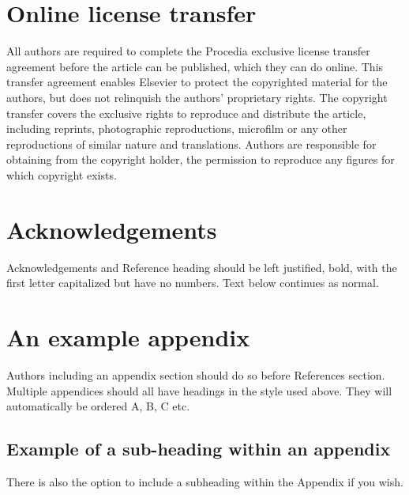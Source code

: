 \documentclass[3p,times,procedia]{elsarticle}
\begin{document}
\section{Online license transfer}
All authors are required to complete the Procedia exclusive license transfer agreement before the article can be published, which they can do online. This transfer agreement enables Elsevier to protect the copyrighted material for the authors, but does not relinquish the authors' proprietary rights. The copyright transfer covers the exclusive rights to reproduce and distribute the article, including reprints, photographic reproductions, microfilm or any other reproductions of similar nature and translations. Authors are responsible for obtaining from the copyright holder, the permission to reproduce any figures for which copyright exists.

\section*{Acknowledgements}

Acknowledgements and Reference heading should be left justified, bold, with the first letter capitalized but have no numbers. Text below continues as normal.



\appendix
\section{An example appendix}
Authors including an appendix section should do so before References section. Multiple appendices should all have headings in the style used above. They will automatically be ordered A, B, C etc.

\subsection{Example of a sub-heading within an appendix}
There is also the option to include a subheading within the Appendix if you wish.
\end{document}
